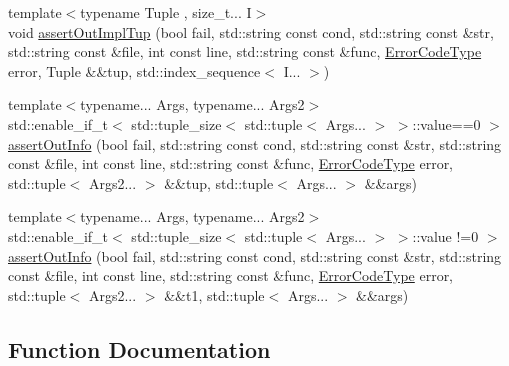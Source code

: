 \begin{DoxyCompactItemize}
\item 
{\footnotesize template$<$typename Tuple , size\+\_\+t... I$>$ }\\void \hyperlink{namespacevt_1_1debug_1_1assert_ab6abd4cf4f3c08bc228bb426ed920bce}{assert\+Out\+Impl\+Tup} (bool fail, std\+::string const cond, std\+::string const \&str, std\+::string const \&file, int const line, std\+::string const \&func, \hyperlink{namespacevt_a793764d753923abc3d32929870beb485}{Error\+Code\+Type} error, Tuple \&\&tup, std\+::index\+\_\+sequence$<$ I... $>$)
\item 
{\footnotesize template$<$typename... Args, typename... Args2$>$ }\\std\+::enable\+\_\+if\+\_\+t$<$ std\+::tuple\+\_\+size$<$ std\+::tuple$<$ Args... $>$ $>$\+::value==0 $>$ \hyperlink{namespacevt_1_1debug_1_1assert_a91f318f3df8ee377f4f25aba03fe4f26}{assert\+Out\+Info} (bool fail, std\+::string const cond, std\+::string const \&str, std\+::string const \&file, int const line, std\+::string const \&func, \hyperlink{namespacevt_a793764d753923abc3d32929870beb485}{Error\+Code\+Type} error, std\+::tuple$<$ Args2... $>$ \&\&tup, std\+::tuple$<$ Args... $>$ \&\&args)
\item 
{\footnotesize template$<$typename... Args, typename... Args2$>$ }\\std\+::enable\+\_\+if\+\_\+t$<$ std\+::tuple\+\_\+size$<$ std\+::tuple$<$ Args... $>$ $>$\+::value !=0 $>$ \hyperlink{namespacevt_1_1debug_1_1assert_a4a74f966d45347110a86f76e821c3e7c}{assert\+Out\+Info} (bool fail, std\+::string const cond, std\+::string const \&str, std\+::string const \&file, int const line, std\+::string const \&func, \hyperlink{namespacevt_a793764d753923abc3d32929870beb485}{Error\+Code\+Type} error, std\+::tuple$<$ Args2... $>$ \&\&t1, std\+::tuple$<$ Args... $>$ \&\&args)
\end{DoxyCompactItemize}


\subsection{Function Documentation}
\mbox{\label{namespacevt_1_1debug_1_1assert_abb19d5cbedec26872e97631a935f8716}} 
